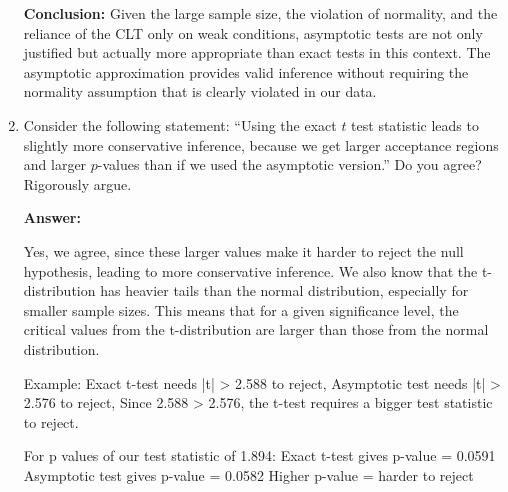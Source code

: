 \documentclass[12pt,a4paper]{article}
\begin{document}
\begin{enumerate}[label=(\alph*)]
\begin{enumerate}
\end{enumerate}

\textbf{Conclusion:} Given the large sample size, the violation 
of normality, and the reliance of the CLT only on weak conditions, 
asymptotic tests are not only justified but actually more 
appropriate than exact tests in this context. The asymptotic 
approximation provides valid inference without requiring the 
normality assumption that is clearly violated in our data.
  
  \item Consider the following statement: ``Using the exact $t$ test statistic leads to slightly more conservative inference, because we get larger acceptance regions and larger $p$-values than if we used the asymptotic version.'' Do you agree? Rigorously argue.
  
  \textbf{Answer:} 

  Yes, we agree, since these larger values make it harder to reject the null hypothesis, leading to more conservative inference. 
  We also know that the t-distribution has heavier tails than the normal distribution, especially for smaller sample sizes. This means that for a given significance level, the critical values from the t-distribution are larger than those from the normal distribution.
  
  Example: Exact t-test needs |t| > 2.588 to reject, Asymptotic test needs |t| > 2.576 to reject, Since 2.588 > 2.576, the t-test requires a bigger test statistic to reject.

  For p values of our test statistic of 1.894:
  Exact t-test gives p-value = 0.0591
  Asymptotic test gives p-value = 0.0582
  Higher p-value = harder to reject
  
\end{enumerate}
\end{document}

